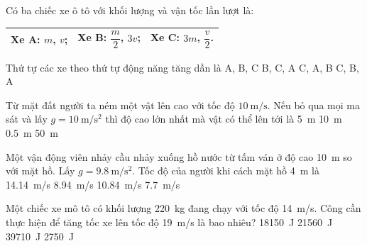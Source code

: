 \begin{ex}
	Có ba chiếc xe ô tô với khối lượng và vận tốc lần lượt là:
	\begin{center}
		\renewcommand{\arraystretch}{1.8}
		\begin{tabular}{|M{5cm}|M{5cm}|M{5cm}|}
			\hline
			Xe A: $m$, $v$;&Xe B: $\dfrac{m}{2}$, $3v$; &Xe C: $3m$, $\dfrac{v}{2}$.\\
			\hline
		\end{tabular}
	\end{center}
	Thứ tự các xe theo thứ tự động năng tăng dần là
	\choice
	{A, B, C}
	{B, C, A}
	{\True  C, A, B}
	{C, B, A}
	\loigiai{}
\end{ex}
\begin{ex}
	Từ mặt đất người ta ném một vật lên cao với tốc độ $\SI{10}{\meter/\second}$. Nếu bỏ qua mọi ma sát và lấy $g=\SI{10}{\meter/\second^2}$ thì độ cao lớn nhất mà vật có thể lên tới là
	\choice
	{\True \SI{5}{\meter}}
	{\SI{10}{\meter}}
	{\SI{0.5}{\meter}}
	{\SI{50}{\meter}}
\end{ex}
\begin{ex}
	Một vận động viên nhảy cầu nhảy xuống hồ nước từ tấm ván ở độ cao \SI{10}{\meter} so với mặt hồ. Lấy $g=\SI{9.8}{\meter/\second^2}$. Tốc độ của người khi cách mặt hồ \SI{4}{\meter} là
	\choice
	{\SI{14.14}{\meter/\second}}
	{\SI{8.94}{\meter/\second}}
	{\True \SI{10.84}{\meter/\second}}
	{\SI{7.7}{\meter/\second}}
\end{ex}
\begin{ex}
	Một chiếc xe mô tô có khối lượng \SI{220}{\kilogram} đang chạy với tốc độ \SI{14}{\meter/\second}. Công cần thực hiện để tăng tốc xe lên tốc độ \SI{19}{\meter/\second} là bao nhiêu?
	\choice
	{\True \SI{18150}{\joule}}
	{\SI{21560}{\joule}}
	{\SI{39710}{\joule}}
	{\SI{2750}{\joule}}
\end{ex}
